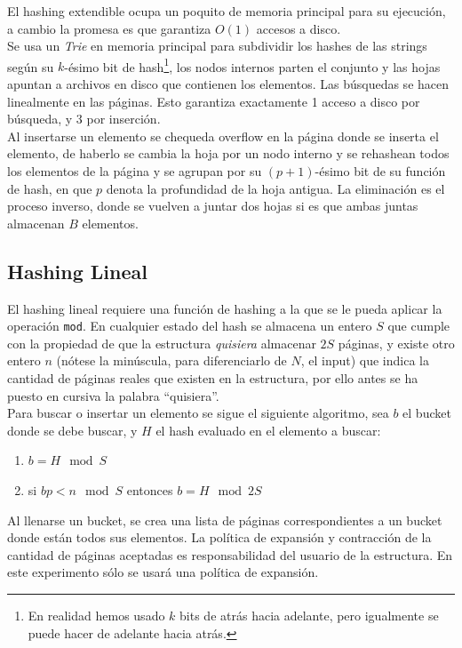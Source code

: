 \documentclass[12pt,letterpaper]{report}
\begin{document}
El hashing extendible ocupa un poquito de memoria principal para su ejecución, a cambio la promesa es que garantiza $O(1)$ accesos a disco.\\

Se usa un \emph{Trie} en memoria principal para subdividir los hashes de las strings según su $k$-ésimo bit de hash\footnote{En realidad hemos usado $k$ bits de atrás hacia adelante, pero igualmente se puede hacer de adelante hacia atrás.}, los nodos internos parten el conjunto y las hojas apuntan a archivos en disco que contienen los elementos. Las búsquedas se hacen linealmente en las páginas. Esto garantiza exactamente 1 acceso a disco por búsqueda, y 3 por inserción.\\

Al insertarse un elemento se chequeda overflow en la página donde se inserta el elemento, de haberlo se cambia la hoja por un nodo interno y se rehashean todos los elementos de la página y se agrupan por su $(p+1)$-ésimo bit de su función de hash, en que $p$ denota la profundidad de la hoja antigua. La eliminación es el proceso inverso, donde se vuelven a juntar dos hojas si es que ambas juntas almacenan $B$ elementos.

\subsection{Hashing Lineal}

El hashing lineal requiere una función de hashing a la que se le pueda aplicar la operación \texttt{mod}. En cualquier estado del hash se almacena un entero $S$ que cumple con la propiedad de que la estructura \emph{quisiera} almacenar $2S$ páginas, y existe otro entero $n$ (nótese la minúscula, para diferenciarlo de $N$, el input) que indica la cantidad de páginas reales que existen en la estructura, por ello antes se ha puesto en cursiva la palabra ``quisiera''.\\

Para buscar o insertar un elemento se sigue el siguiente algoritmo, sea $b$ el bucket donde se debe buscar, y $H$ el hash evaluado en el elemento a buscar:
\begin{enumerate}
\item $b = H\mod S$
\item si $bp < n\mod S$ entonces $b = H\mod 2S$
\end{enumerate}

Al llenarse un bucket, se crea una lista de páginas correspondientes a un bucket donde están todos sus elementos. La política de expansión y contracción de la cantidad de páginas aceptadas es responsabilidad del usuario de la estructura. En este experimento sólo se usará una política de expansión.\\
\end{document}

